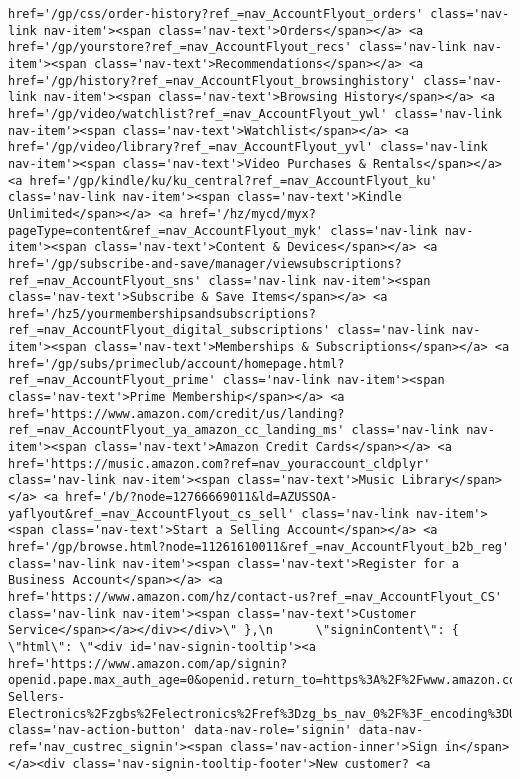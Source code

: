 \documentclass[
]{article}
\begin{document}
\begin{verbatim}
href='/gp/css/order-history?ref_=nav_AccountFlyout_orders' class='nav-link nav-item'><span class='nav-text'>Orders</span></a> <a href='/gp/yourstore?ref_=nav_AccountFlyout_recs' class='nav-link nav-item'><span class='nav-text'>Recommendations</span></a> <a href='/gp/history?ref_=nav_AccountFlyout_browsinghistory' class='nav-link nav-item'><span class='nav-text'>Browsing History</span></a> <a href='/gp/video/watchlist?ref_=nav_AccountFlyout_ywl' class='nav-link nav-item'><span class='nav-text'>Watchlist</span></a> <a href='/gp/video/library?ref_=nav_AccountFlyout_yvl' class='nav-link nav-item'><span class='nav-text'>Video Purchases & Rentals</span></a> <a href='/gp/kindle/ku/ku_central?ref_=nav_AccountFlyout_ku' class='nav-link nav-item'><span class='nav-text'>Kindle Unlimited</span></a> <a href='/hz/mycd/myx?pageType=content&ref_=nav_AccountFlyout_myk' class='nav-link nav-item'><span class='nav-text'>Content & Devices</span></a> <a href='/gp/subscribe-and-save/manager/viewsubscriptions?ref_=nav_AccountFlyout_sns' class='nav-link nav-item'><span class='nav-text'>Subscribe & Save Items</span></a> <a href='/hz5/yourmembershipsandsubscriptions?ref_=nav_AccountFlyout_digital_subscriptions' class='nav-link nav-item'><span class='nav-text'>Memberships & Subscriptions</span></a> <a href='/gp/subs/primeclub/account/homepage.html?ref_=nav_AccountFlyout_prime' class='nav-link nav-item'><span class='nav-text'>Prime Membership</span></a> <a href='https://www.amazon.com/credit/us/landing?ref_=nav_AccountFlyout_ya_amazon_cc_landing_ms' class='nav-link nav-item'><span class='nav-text'>Amazon Credit Cards</span></a> <a href='https://music.amazon.com?ref=nav_youraccount_cldplyr' class='nav-link nav-item'><span class='nav-text'>Music Library</span></a> <a href='/b/?node=12766669011&ld=AZUSSOA-yaflyout&ref_=nav_AccountFlyout_cs_sell' class='nav-link nav-item'><span class='nav-text'>Start a Selling Account</span></a> <a href='/gp/browse.html?node=11261610011&ref_=nav_AccountFlyout_b2b_reg' class='nav-link nav-item'><span class='nav-text'>Register for a Business Account</span></a> <a href='https://www.amazon.com/hz/contact-us?ref_=nav_AccountFlyout_CS' class='nav-link nav-item'><span class='nav-text'>Customer Service</span></a></div></div>\" },\n      \"signinContent\": { \"html\": \"<div id='nav-signin-tooltip'><a href='https://www.amazon.com/ap/signin?openid.pape.max_auth_age=0&openid.return_to=https%3A%2F%2Fwww.amazon.com%2FBest-Sellers-Electronics%2Fzgbs%2Felectronics%2Fref%3Dzg_bs_nav_0%2F%3F_encoding%3DUTF8%26ref_%3Dnav_custrec_signin&openid.identity=http%3A%2F%2Fspecs.openid.net%2Fauth%2F2.0%2Fidentifier_select&openid.assoc_handle=usflex&openid.mode=checkid_setup&openid.claimed_id=http%3A%2F%2Fspecs.openid.net%2Fauth%2F2.0%2Fidentifier_select&openid.ns=http%3A%2F%2Fspecs.openid.net%2Fauth%2F2.0&' class='nav-action-button' data-nav-role='signin' data-nav-ref='nav_custrec_signin'><span class='nav-action-inner'>Sign in</span></a><div class='nav-signin-tooltip-footer'>New customer? <a 
\end{verbatim}
\end{document}
